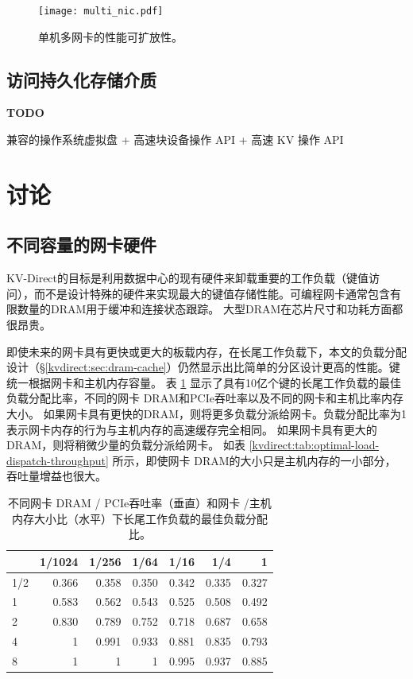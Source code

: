 \begin{figure}[htbp]
	\centering
	\texttt{[image: multi\_nic.pdf]}
	\caption{单机多网卡的性能可扩放性。}
	\label{kvdirect:fig:multiple-nics}
\end{figure}


\subsection{访问持久化存储介质}

\textbf{TODO}

兼容的操作系统虚拟盘 + 高速块设备操作 API + 高速 KV 操作 API


\section{讨论}
\label{kvdirect:sec:discussion}

\subsection{不同容量的网卡硬件}
\label{kvdirect:sec:different-nic}

KV-Direct的目标是利用数据中心的现有硬件来卸载重要的工作负载（键值访问），而不是设计特殊的硬件来实现最大的键值存储性能。可编程网卡通常包含有限数量的DRAM用于缓冲和连接状态跟踪。 大型DRAM在芯片尺寸和功耗方面都很昂贵。

即使未来的网卡具有更快或更大的板载内存，在长尾工作负载下，本文的负载分配设计（\S \ref {kvdirect:sec:dram-cache}）仍然显示出比简单的分区设计更高的性能。键统一根据网卡和主机内存容量。
表 \ref {kvdirect:tab:optimal-load-dispatch} 显示了具有10亿个键的长尾工作负载的最佳负载分配比率，不同的网卡 DRAM和PCIe吞吐率以及不同的网卡和主机比率内存大小。
如果网卡具有更快的DRAM，则将更多负载分派给网卡。负载分配比率为1表示网卡内存的行为与主机内存的高速缓存完全相同。
如果网卡具有更大的DRAM，则将稍微少量的负载分派给网卡。
如表 \ref {kvdirect:tab:optimal-load-dispatch-throughput} 所示，即使网卡 DRAM的大小只是主机内存的一小部分，吞吐量增益也很大。


\begin{table}[t]
	\centering
	\caption{不同网卡 DRAM / PCIe吞吐率（垂直）和网卡 /主机内存大小比（水平）下长尾工作负载的最佳负载分配比。}
	\label{kvdirect:tab:optimal-load-dispatch}
	\small
	\begin{tabular}{|l|r|r|r|r|r|r|}
		\hline
		& 1/1024 & 1/256 & 1/64 & 1/16 & 1/4 & 1 \\
		\hline
		1/2  & 0.366 & 0.358 & 0.350 & 0.342 & 0.335 & 0.327 \\
		\hline
		1    & 0.583 & 0.562 & 0.543 & 0.525 & 0.508 & 0.492 \\
		\hline
		2    & 0.830 & 0.789 & 0.752 & 0.718 & 0.687 & 0.658 \\
		\hline
		4    & 1     & 0.991 & 0.933 & 0.881 & 0.835 & 0.793 \\
		\hline
		8    & 1     & 1     & 1     & 0.995 & 0.937 & 0.885 \\
		\hline
	\end{tabular}
\end{table}



